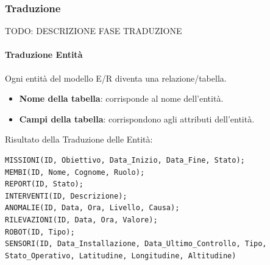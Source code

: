 \subsubsection{Traduzione}

TODO: DESCRIZIONE FASE TRADUZIONE

\paragraph{Traduzione Entità}

Ogni entità del modello E/R diventa una relazione/tabella.
\begin{itemize}
    \item \textbf{Nome della tabella}: corrisponde al nome dell’entità.
    \item \textbf{Campi della tabella}: corrispondono agli attributi dell’entità.
\end{itemize}

Risultato della Traduzione delle Entità:
\begin{lstlisting}
MISSIONI(ID, Obiettivo, Data_Inizio, Data_Fine, Stato);
MEMBI(ID, Nome, Cognome, Ruolo);
REPORT(ID, Stato);
INTERVENTI(ID, Descrizione);
ANOMALIE(ID, Data, Ora, Livello, Causa);
RILEVAZIONI(ID, Data, Ora, Valore);
ROBOT(ID, Tipo);
SENSORI(ID, Data_Installazione, Data_Ultimo_Controllo, Tipo, Stato_Operativo, Latitudine, Longitudine, Altitudine)
\end{lstlisting}

